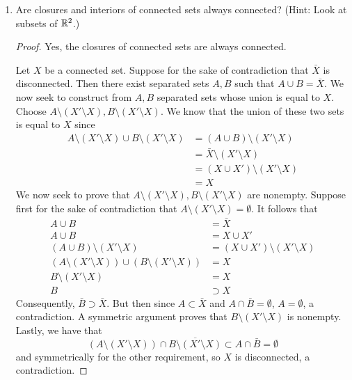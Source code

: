 \documentclass[../psets.tex]{subfiles}
\begin{document}
\begin{enumerate}[label={\textbf{\arabic*.}}]
\begin{enumerate}
\begin{proof}
        \end{proof}
    \end{enumerate}
    \item Are closures and interiors of connected sets always connected? (Hint: Look at subsets of $\mathbb{R}^2$.)
    \begin{proof}
        Yes, the closures of connected sets are always connected.\par
        Let $X$ be a connected set. Suppose for the sake of contradiction that $\bar{X}$ is disconnected. Then there exist separated sets $A,B$ such that $A\cup B=\bar{X}$. We now seek to construct from $A,B$ separated sets whose union is equal to $X$. Choose $A\setminus(X'\setminus X),B\setminus(X'\setminus X)$. We know that the union of these two sets is equal to $X$ since
        \begin{align*}
            A\setminus(X'\setminus X)\cup B\setminus(X'\setminus X) &= (A\cup B)\setminus(X'\setminus X)\\
            &= \bar{X}\setminus(X'\setminus X)\\
            &= (X\cup X')\setminus(X'\setminus X)\\
            &= X
        \end{align*}
        We now seek to prove that $A\setminus(X'\setminus X),B\setminus(X'\setminus X)$ are nonempty. Suppose first for the sake of contradiction that $A\setminus(X'\setminus X)=\emptyset$. It follows that
        \begin{align*}
            A\cup B &= \bar{X}\\
            A\cup B &= X\cup X'\\
            (A\cup B)\setminus(X'\setminus X) &= (X\cup X')\setminus(X'\setminus X)\\
            (A\setminus(X'\setminus X))\cup(B\setminus(X'\setminus X)) &= X\\
            B\setminus(X'\setminus X) &= X\\
            B &\supset X
        \end{align*}
        Consequently, $\bar{B}\supset\bar{X}$. But then since $A\subset\bar{X}$ and $A\cap\bar{B}=\emptyset$, $A=\emptyset$, a contradiction. A symmetric argument proves that $B\setminus(X'\setminus X)$ is nonempty. Lastly, we have that
        \begin{equation*}
            (A\setminus(X'\setminus X))\cap\overline{B\setminus(X'\setminus X)} \subset A\cap\bar{B} = \emptyset
        \end{equation*}
        and symmetrically for the other requirement, so $X$ is disconnected, a contradiction.\par\smallskip

\end{proof}
\end{enumerate}
\end{document}

